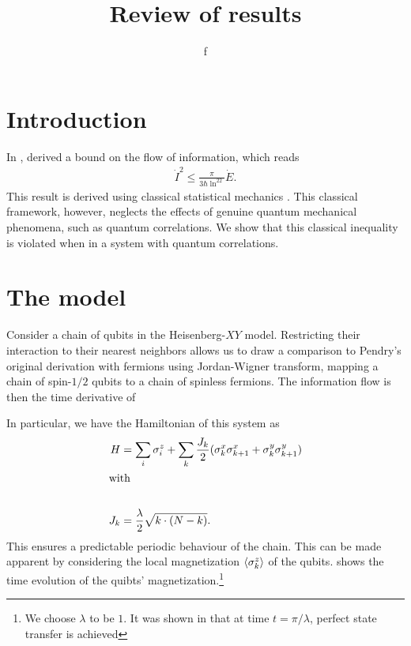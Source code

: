 \documentclass[a4paper,11pt]{scrartcl}
\author{f}
\title{Review of results}
\begin{document}
\maketitle
\section{Introduction}
In \citeyear{BA_Pendry_1983}, \citeauthor{BA_Pendry_1983} derived a bound on the flow of information, which reads
\begin{align}\label{eq:pendry}
    \dot{I}^2 \leq \frac{\pi}{3\hbar\ln^22}\dot{E}.
\end{align}
This result is derived using classical statistical mechanics \cite{BA_Pendry_1983}. This classical framework, however,
neglects the effects of genuine quantum mechanical phenomena, such as quantum correlations. We show that this
classical inequality is violated when in a system with quantum correlations.
\section{The model}
Consider a chain of qubits in the Heisenberg-$XY$ model. Restricting their interaction to their nearest neighbors allows
us to draw a comparison to Pendry's original derivation with fermions using Jordan-Wigner transform, mapping a chain of
spin-$1/2$ qubits to a chain of spinless fermions. The information flow is then the time derivative of 

In particular, we have the Hamiltonian of this system as
\begin{align}\label{eq:hamiltonian-perfect-transfer}
    H &= \sum\limits_i \sigma^z_i + \sum\limits_k \frac{J_k}{2} (\sigma^x_k\sigma^x_{k+1}+\sigma^y_k\sigma^y_{k+1})\\
    \shortintertext{with}\\
    J_k &= \frac{\lambda}{2}\sqrt{k\cdot(N-k)}.\nonumber
\end{align}
This ensures a predictable periodic behaviour of the chain. This can be made apparent by considering the local
magnetization $\expval{\sigma^z_k}$ of the qubits.  shows the time evolution of the quibts'
magnetization.\footnote{We choose $\lambda$ to be $1$. It was shown in \cite{BA_Christandl_2004} that at
time $t=\pi/\lambda$, perfect state transfer is achieved}
\end{document}
